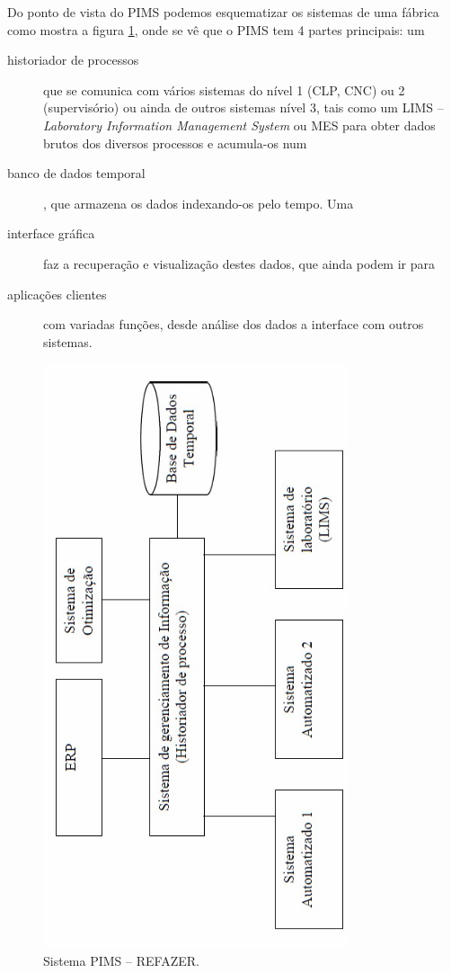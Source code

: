 	Do ponto de vista do PIMS podemos esquematizar os sistemas de uma fábrica como mostra a figura \ref{fig:PIMS}, onde se vê que o PIMS tem 4 partes principais: um
	\begin{description}
		\item[historiador de processos] que se comunica com vários sistemas do nível 1 (CLP, CNC) ou 2 (supervisório) ou ainda de outros sistemas nível 3, tais como um LIMS -- \emph{Laboratory Information Management System} ou MES para obter dados brutos dos diversos processos e acumula-os num
		\item[banco de dados temporal], que armazena os dados indexando-os pelo tempo. Uma
		\item[interface gráfica] faz a recuperação e visualização destes dados, que ainda podem ir para
		\item[aplicações clientes] com variadas funções, desde análise dos dados a interface com outros sistemas.
	\end{description}
	\begin{figure}[hbt]
		\begin{center}
			\includegraphics[angle=-90,width=0.8\textwidth]{PIMS}
		\end{center}
		\caption{Sistema PIMS -- REFAZER.}
		\label{fig:PIMS}
	\end{figure}

